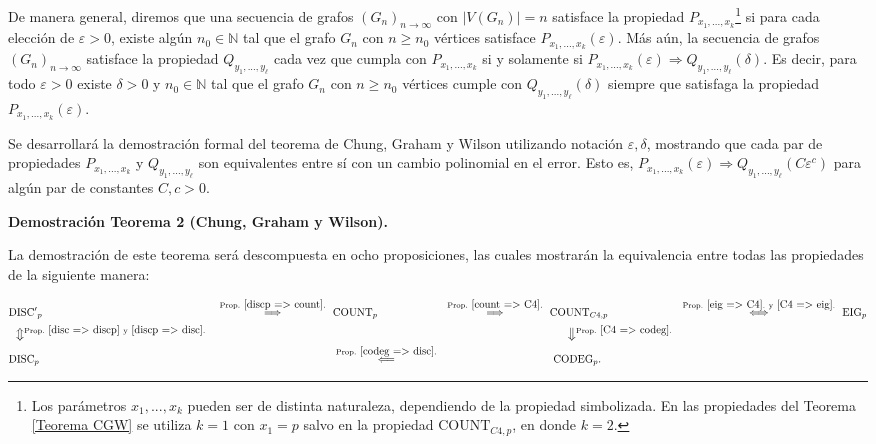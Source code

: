 \documentclass{article}[14pts]
\newcommand{\disc}{\mathrm{DISC}}
\newcommand{\discp}{\mathrm{DISC'}}
\newcommand{\Count}{\mathrm{COUNT}}
\newcommand{\codeg}{\mathrm{CODEG}}
\newcommand{\eig}{\mathrm{EIG}}
\let\varepsilon=\varepsilon
\begin{document}
De manera general, diremos que una secuencia de grafos $(G_n)_{n\to\infty}$ con $|V(G_n)| = n$ satisface la propiedad $P_{x_1,...,x_k}$\footnote{Los parámetros $x_1,...,x_k$ pueden ser de distinta naturaleza, dependiendo de la propiedad simbolizada. En las propiedades del Teorema \ref{Teorema CGW} se utiliza $k=1$ con $x_1 = p$ salvo en la propiedad $\Count_{C4,p}$, en donde $k=2$.} si para cada elección de $\varepsilon >0$, existe algún $n_0 \in \mathbb{N}$ tal que el grafo $G_n$ con $n\geq n_0$ vértices satisface $P_{x_1,...,x_k}(\varepsilon)$. Más aún, la secuencia de grafos $(G_n)_{n\to\infty}$ satisface la propiedad $Q_{y_1,...,y_\ell}$ cada vez que cumpla con $P_{x_1,...,x_k}$ si y solamente si $P_{x_1,...,x_k}(\varepsilon) \Rightarrow Q_{y_1,...,y_\ell}(\delta)$. Es decir, para todo $\varepsilon > 0$ existe $\delta > 0$ y $n_0\in\mathbb{N}$ tal que el grafo $G_n$ con $n\geq n_0$ vértices cumple con $Q_{y_1,...,y_\ell}(\delta)$ siempre que satisfaga la propiedad $P_{x_1,...,x_k}(\varepsilon)$.\medskip

Se desarrollará la demostración formal del teorema de Chung, Graham y Wilson utilizando notación $\varepsilon , \delta$, mostrando que cada par de propiedades $P_{x_1,...,x_k}$ y $Q_{y_1,...,y_\ell}$ son equivalentes entre sí con un cambio polinomial en el error. Esto es, $P_{x_1,...,x_k}(\varepsilon) \Rightarrow Q_{y_1,...,y_\ell}(C\varepsilon^{c})$ para algún par de constantes $C,c > 0$.

\begin{flushleft}
    \Large
    \textbf{Demostración Teorema 2 (Chung, Graham y Wilson).}\\
    \normalsize
\end{flushleft}

La demostración de este teorema será descompuesta en ocho proposiciones, las cuales mostrarán la equivalencia entre todas las propiedades de la siguiente manera:

\begin{equation} \label{Ciclo demo CGW}
    \begin{aligned}
        &\discp_p & \overset{\mathrm{Prop.}\  \ref{discp => count}.}{\Longrightarrow} & \ \ \Count_p & \overset{\mathrm{Prop.}\ \ref{count => C4}.}{\Longrightarrow} & \ \ \Count_{C4,p} & \overset{\mathrm{Prop.}\ \ref{eig => C4}.\ \mathrm{y}\ \ref{C4 => eig}.}{\Longleftrightarrow} & \ \ \eig_p\\
        &\ \ \big\Updownarrow \overset{\mathrm{Prop.}\ \ref{disc => discp}\ \mathrm{y}\ \ref{discp => disc}.}{}\ & \ & \ & \ & \ \ \ \ \ \ \ \big\Downarrow \overset{\mathrm{Prop.}\ \ref{C4 => codeg}.}{}& \ & \ \\
        &\disc_p &\ &\ \ \overset{\mathrm{Prop.}\ \ref{codeg => disc}.}{\Longleftarrow} &\ &\ \ \ \codeg_p.
    \end{aligned}
\end{equation}
\end{document}
